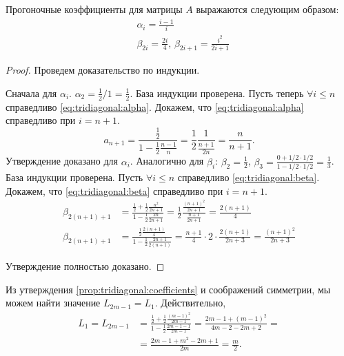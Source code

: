 \begin{prop}
\label{prop:tridiagonal:coefficients}
Прогоночные коэффициенты для матрицы $ A $ выражаются следующим образом:
\begin{align}
\label{eq:tridiagonal:alpha}
&\alpha_i = \frac{i-1}{i} \\
\label{eq:tridiagonal:beta}
&\beta_{2i} = \frac{2i}{4}, \,
\beta_{2i+1} = \frac{i^2}{2i+1}
\end{align}
\end{prop}
\begin{proof}
Проведем доказательство по индукции. 

Сначала для $ \alpha_i $. $ \alpha_2  = \frac{1}{2} / 1 = \frac{1}{2} $. База индукции проверена. Пусть теперь $ \forall i \leq n $ справедливо \eqref{eq:tridiagonal:alpha}. Докажем, что \eqref{eq:tridiagonal:alpha} справедливо при $ i = n + 1 $.
\[
    a_{n+1} = \frac{\frac{1}{2}}{1 - \frac{1}{2}\frac{n - 1}{n}}
    = \frac{1}{2} \frac{1}{\frac{n+1}{2n}} = \frac{n}{n+1}.
\]
Утверждение доказано для $ \alpha_i $. Аналогично для $ \beta_i $: 
$ \beta_2 = \frac{1}{2} $, 
$  \beta_3 = \frac{0 + 1/2 \cdot 1/2}{1 - 1/2 \cdot 1/2} = \frac{1}{3} $. База индукции проверена. Пусть $ \forall i \leq n $ справедливо \eqref{eq:tridiagonal:beta}. Докажем, что \eqref{eq:tridiagonal:beta} справедливо при $ i = n + 1 $.
\begin{align*}
    \beta_{2(n+1)+1} 
    &= \frac{
        \frac{1}{2} + \frac{1}{2} \frac{n^2}{2n+1}
    }{
        1 - \frac{1}{2} \frac{2n}{2n+1}
    }
    = \frac{1}{2} \frac{
        \frac{(n+1)^2}{2n+1}
    }{
        \frac{n+1}{2n+1}
    }
    = \frac{2(n+1)}{4} \\
    \beta_{2(n+1)+1}
    &= \frac{
        \frac{1}{2} \frac{2(n+1)}{4}
    }{
        1 - \frac{1}{2} \frac{2n+1}{2(n+1)}
    }
    = \frac{n+1}{4} \cdot 2 \cdot \frac{2(n+1)}{2n+3} = \frac{(n+1)^2}{2n+3}
\end{align*}

Утверждение полностью доказано.
\end{proof}

Из утверждения \ref{prop:tridiagonal:coefficients} и соображений симметрии, мы можем найти значение $ L_{2m - 1} = L_1 $. Действительно,
\begin{align}
\label{eq:lower_bound:recurrent_boundaries}
L_1 = L_{2m-1} &= 
\frac{
    \frac{1}{2} + \frac{1}{2}\frac{(m-1)^2}{2m-1}
}{
    1 - \frac{1}{2}\frac{2m-1-1}{2m-1}
} =
\frac{
    2m - 1 + (m-1)^2
}{
    4m - 2 - 2m + 2
} = \nonumber \\
& = \frac{2m - 1 + m^2  - 2m + 1}{2m} = \frac{m}{2}.
\end{align}

